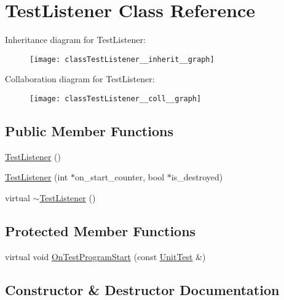 \hypertarget{classTestListener}{}\section{Test\+Listener Class Reference}
\label{classTestListener}


Inheritance diagram for Test\+Listener\+:
\nopagebreak
\begin{figure}[H]
\begin{center}
\leavevmode
\texttt{[image: classTestListener\_\_inherit\_\_graph]}
\end{center}
\end{figure}


Collaboration diagram for Test\+Listener\+:
\nopagebreak
\begin{figure}[H]
\begin{center}
\leavevmode
\texttt{[image: classTestListener\_\_coll\_\_graph]}
\end{center}
\end{figure}
\subsection*{Public Member Functions}
\begin{DoxyCompactItemize}
\item 
\hyperlink{classTestListener_ae20c874ce92777371de6d024df229e9f}{Test\+Listener} ()
\item 
\hyperlink{classTestListener_ab65604c6c3742c494e9378e770da5d42}{Test\+Listener} (int $\ast$on\+\_\+start\+\_\+counter, bool $\ast$is\+\_\+destroyed)
\item 
virtual \hyperlink{classTestListener_ae59dec3ae673618185eebf71881902e9}{$\sim$\+Test\+Listener} ()
\end{DoxyCompactItemize}
\subsection*{Protected Member Functions}
\begin{DoxyCompactItemize}
\item 
virtual void \hyperlink{classTestListener_a6218f522f5b6b37050ff0ea630ac5fd3}{On\+Test\+Program\+Start} (const \hyperlink{classtesting_1_1UnitTest}{Unit\+Test} \&)
\end{DoxyCompactItemize}


\subsection{Constructor \& Destructor Documentation}
